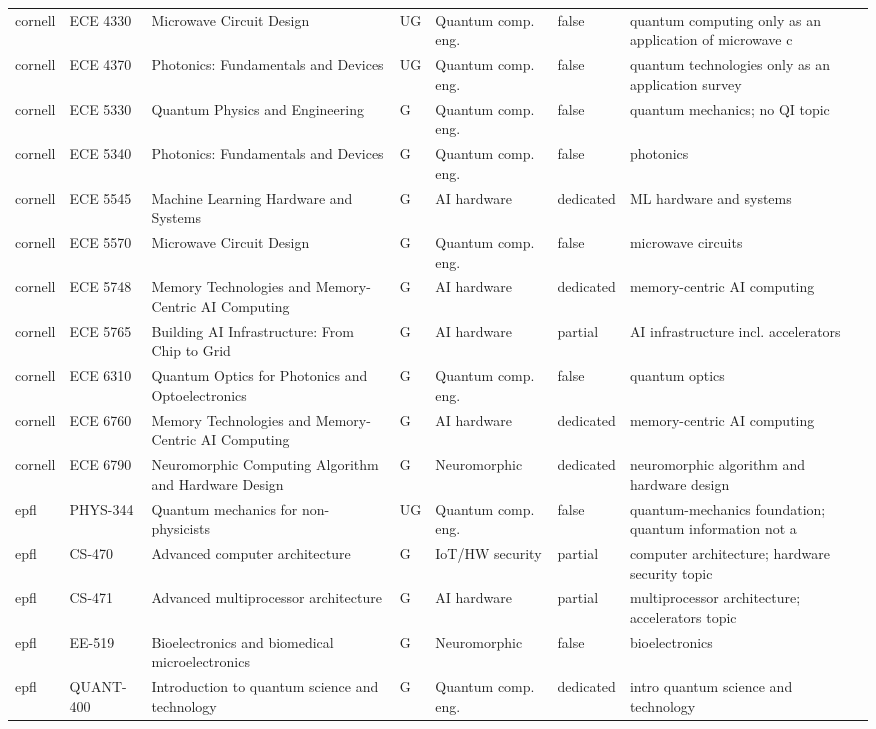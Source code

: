\documentclass[10pt]{article}
\begin{document}
\begin{longtable}{@{}llL{4.6cm}llll@{}}
cornell & ECE 4330 & Microwave Circuit Design & UG & Quantum comp. eng. & false & quantum computing only as an application of microwave c \\
cornell & ECE 4370 & Photonics: Fundamentals and Devices & UG & Quantum comp. eng. & false & quantum technologies only as an application survey \\
cornell & ECE 5330 & Quantum Physics and Engineering & G & Quantum comp. eng. & false & quantum mechanics; no QI topic \\
cornell & ECE 5340 & Photonics: Fundamentals and Devices & G & Quantum comp. eng. & false & photonics \\
cornell & ECE 5545 & Machine Learning Hardware and Systems & G & AI hardware & dedicated & ML hardware and systems \\
cornell & ECE 5570 & Microwave Circuit Design & G & Quantum comp. eng. & false & microwave circuits \\
cornell & ECE 5748 & Memory Technologies and Memory-Centric AI Computing & G & AI hardware & dedicated & memory-centric AI computing \\
cornell & ECE 5765 & Building AI Infrastructure: From Chip to Grid & G & AI hardware & partial & AI infrastructure incl. accelerators \\
cornell & ECE 6310 & Quantum Optics for Photonics and Optoelectronics & G & Quantum comp. eng. & false & quantum optics \\
cornell & ECE 6760 & Memory Technologies and Memory-Centric AI Computing & G & AI hardware & dedicated & memory-centric AI computing \\
cornell & ECE 6790 & Neuromorphic Computing Algorithm and Hardware Design & G & Neuromorphic & dedicated & neuromorphic algorithm and hardware design \\
epfl & PHYS-344 & Quantum mechanics for non-physicists & UG & Quantum comp. eng. & false & quantum-mechanics foundation; quantum information not a \\
epfl & CS-470 & Advanced computer architecture & G & IoT/HW security & partial & computer architecture; hardware security topic \\
epfl & CS-471 & Advanced multiprocessor architecture & G & AI hardware & partial & multiprocessor architecture; accelerators topic \\
epfl & EE-519 & Bioelectronics and biomedical microelectronics & G & Neuromorphic & false & bioelectronics \\
epfl & QUANT-400 & Introduction to quantum science and technology & G & Quantum comp. eng. & dedicated & intro quantum science and technology \\

\end{longtable}
\end{document}
